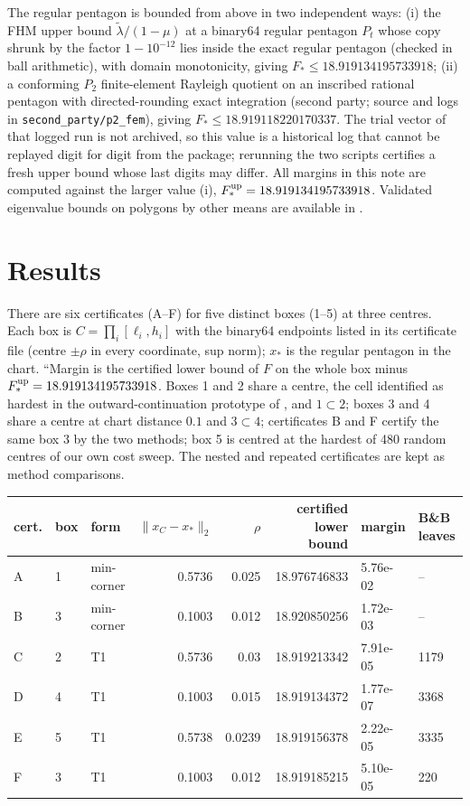 \documentclass[11pt]{article}
\theoremstyle{remark}
\begin{document}
The regular pentagon is bounded from above in two independent ways:
(i) the FHM upper bound $\tilde\lambda/(1-\mu)$ at a binary64 regular pentagon $P_t$ whose copy shrunk by the factor
$1-10^{-12}$ lies inside the exact regular pentagon (checked in ball arithmetic), with domain monotonicity, giving
$F_*\le 18.919134195733918$; (ii) a conforming $P_2$ finite-element Rayleigh quotient on an inscribed rational
pentagon with directed-rounding exact integration (second party; source and logs in \texttt{second\_party/p2\_fem}),
giving $F_*\le 18.919118220170337$. The trial vector of that logged run is not archived, so this value is a
historical log that cannot be replayed digit for digit from the package; rerunning the two scripts certifies a fresh
upper bound whose last digits may differ. All margins in this note are computed against the larger value (i),
$F_*^{\rm up}=18.919134195733918$. Validated eigenvalue bounds on polygons by other means are available in \cite{lo}.

\section{Results}\label{sec:results}
There are six certificates (A--F) for five distinct boxes (1--5) at three centres. Each box is $C=\prod_i[\ell_i,h_i]$ with the binary64 endpoints listed in its certificate file (centre $\pm\rho$ in every coordinate, sup norm); $x_*$ is the regular pentagon in the chart. ``Margin is the certified lower bound of $F$ on the whole box minus $F_*^{\rm up}=18.919134195733918$. Boxes 1 and 2 share a centre, the cell identified as hardest in the outward-continuation prototype of \cite{liu}, and $1\subset2$; boxes 3 and 4 share a centre at chart distance $0.1$ and $3\subset4$; certificates B and F certify the same box 3 by the two methods; box 5 is centred at the hardest of 480 random centres of our own cost sweep. The nested and repeated certificates are kept as method comparisons.

\begin{center}\small
\begin{tabular}{lllrrrll}
\toprule
cert. & box & form & $\|x_C-x_*\|_2$ & $\rho$ & certified lower bound & margin & B\&B leaves\\
\midrule
A & 1 & min-corner & 0.5736 & 0.025 & 18.976746833 & 5.76e-02 & --\\
B & 3 & min-corner & 0.1003 & 0.012 & 18.920850256 & 1.72e-03 & --\\
C & 2 & T1 & 0.5736 & 0.03 & 18.919213342 & 7.91e-05 & 1179\\
D & 4 & T1 & 0.1003 & 0.015 & 18.919134372 & 1.77e-07 & 3368\\
E & 5 & T1 & 0.5738 & 0.0239 & 18.919156378 & 2.22e-05 & 3335\\
F & 3 & T1 & 0.1003 & 0.012 & 18.919185215 & 5.10e-05 & 220\\
\bottomrule
\end{tabular}
\end{center}
\end{document}
